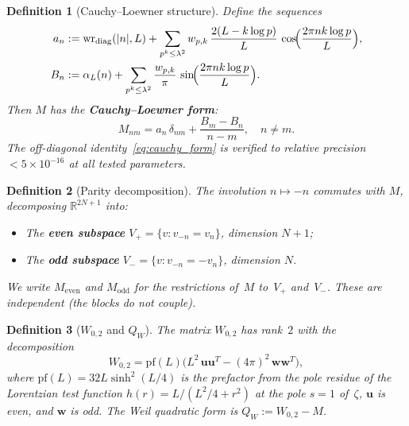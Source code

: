 \documentclass[11pt,a4paper]{article}
\newtheorem{definition}{Definition}[section]
\begin{document}
\begin{definition}[Cauchy--Loewner structure]\label{def:cauchy}
Define the sequences
\begin{align}
a_n &:= \mathrm{wr}_{\mathrm{diag}}(|n|, L) + \sum_{p^k \leq \lambda^2} w_{p,k}\, \frac{2(L - k\log p)}{L}\, \cos\!\Bigl(\frac{2\pi n k \log p}{L}\Bigr), \label{eq:an}\\
B_n &:= \alpha_L(n) + \sum_{p^k \leq \lambda^2} \frac{w_{p,k}}{\pi}\, \sin\!\Bigl(\frac{2\pi n k \log p}{L}\Bigr). \label{eq:Bn}
\end{align}
Then $M$ has the \textbf{Cauchy--Loewner form}:
\begin{equation}\label{eq:cauchy_form}
M_{nm} = a_n\, \delta_{nm} + \frac{B_m - B_n}{n - m}, \quad n \neq m.
\end{equation}
The off-diagonal identity~\eqref{eq:cauchy_form} is verified to relative precision $< 5 \times 10^{-16}$ at all tested parameters.
\end{definition}

\begin{definition}[Parity decomposition]\label{def:parity}
The involution $n \mapsto -n$ commutes with $M$, decomposing $\mathbb{R}^{2N+1}$ into:
\begin{itemize}
\item The \textbf{even subspace} $V_+ = \{v : v_{-n} = v_n\}$, dimension $N+1$;
\item The \textbf{odd subspace} $V_- = \{v : v_{-n} = -v_n\}$, dimension $N$.
\end{itemize}
We write $M_{\mathrm{even}}$ and $M_{\mathrm{odd}}$ for the restrictions of~$M$ to~$V_+$ and~$V_-$. These are independent (the blocks do not couple).
\end{definition}

\begin{definition}[$W_{0,2}$ and $Q_W$]\label{def:QW}
The matrix $W_{0,2}$ has rank~$2$ with the decomposition
\begin{equation}
W_{0,2} = \mathrm{pf}(L) \bigl( L^2\, \mathbf{u}\mathbf{u}^T - (4\pi)^2\, \mathbf{w}\mathbf{w}^T \bigr),
\end{equation}
where $\mathrm{pf}(L) = 32L\sinh^2(L/4)$ is the prefactor from the pole residue of the Lorentzian test function $h(r) = L/(L^2/4 + r^2)$ at the pole $s = 1$ of~$\zeta$, $\mathbf{u}$ is even, and $\mathbf{w}$ is odd. The Weil quadratic form is $Q_W := W_{0,2} - M$.
\end{definition}

\end{document}
